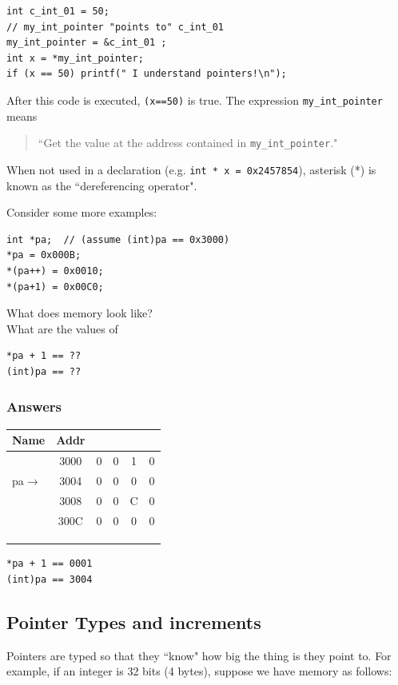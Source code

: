 \documentclass{article}	%
\begin{document}
\begin{verbatim}
int c_int_01 = 50;
// my_int_pointer "points to" c_int_01
my_int_pointer = &c_int_01 ; 
int x = *my_int_pointer;
if (x == 50) printf(" I understand pointers!\n");
\end{verbatim}





After this code is executed, {\tt (x==50)} is true.  
The expression {\tt *my\_int\_pointer} means
\begin{quotation} 
   ``Get the value at the address contained in {\tt my\_int\_pointer}."
   \end{quotation}
When not used in a declaration (e.g. {\tt int * x = 0x2457854}),
asterisk (*) is known as the ``dereferencing operator".
   
   
Consider some more examples:

\begin{verbatim}
int *pa;  // (assume (int)pa == 0x3000)
*pa = 0x000B;
*(pa++) = 0x0010;
*(pa+1) = 0x00C0;
\end{verbatim}
What does memory look like? \\
What are the values of
\begin{verbatim}
*pa + 1 == ??
(int)pa == ??
\end{verbatim}

\subsubsection*{Answers}
\begin{tabular}{l|c|c|c|c|c|}
\hline
Name &Addr & & & & \\ \hline
     & 3000 &0 &0 &1 &0 \\ \hline
pa$\to$ & 3004 &0 &0 &0 &0 \\ \hline
     & 3008 &0 &0 &C &0 \\ \hline
     & 300C &0 &0 &0 &0 \\ \hline
     & & & & & \\ \hline
     & & & & & \\ \hline
     & & & & & \\ \hline
\end{tabular}
\begin{verbatim}
*pa + 1 == 0001
(int)pa == 3004
\end{verbatim}

\subsection{Pointer Types and increments}
Pointers are typed so that they ``know" how big the thing is they point to.  
For example, if an integer is 32 bits (4 bytes), suppose we have memory as follows:	%
\end{document}

